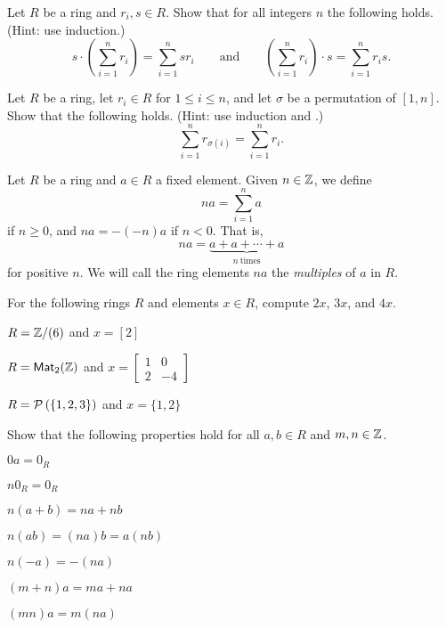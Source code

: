\begin{exercise}
Let \(R\) be a ring and \(r_i, s \in R\). Show that for all integers \(n\) the following holds. (Hint: use induction.) \[ s \cdot \left( \sum_{i=1}^n r_i \right) = \sum_{i=1}^n sr_i \quad\quad \mathrm{and} \quad\quad \left( \sum_{i=1}^n r_i \right) \cdot s = \sum_{i=1}^n r_i s. \]
\end{exercise}

\begin{exercise}
Let \(R\) be a ring, let \(r_i \in R\) for \(1 \leq i \leq n\), and let \(\sigma\) be a permutation of \([1,n]\). Show that the following holds. (Hint: use induction and .) \[ \sum_{i=1}^n r_{\sigma(i)} = \sum_{i=1}^n r_i.  \]
\end{exercise}

\begin{dfn} \label{dfn:mult-elt}
Let \(R\) be a ring and \(a \in R\) a fixed element. Given \(n \in \mathbb{Z}\), we define \[ na = \sum_{i=1}^n a \] if \(n \geq 0\), and \(na = -(-n)a\) if \(n < 0\). That is, \[ na = \underbrace{a + a + \cdots + a}_{n\ \mathrm{times}} \] for positive \(n\). We will call the ring elements \(na\) the \emph{multiples} of \(a\) in \(R\).
\end{dfn}

\begin{exercise}
For the following rings \(R\) and elements \(x \in R\), compute \(2x\), \(3x\), and \(4x\).
\begin{proplist}
\item \(R = \mathbb{Z}/(6)\) and \(x = [2]\)
\item \(R = \mathsf{Mat}_{2}(\mathbb{Z})\) and \(x = \begin{bmatrix} 1 & 0 \\ 2 & -4 \end{bmatrix}\)
\item \(R = \mathcal{P}\left(\{ 1,2,3 \}\right)\) and \(x = \{ 1,2 \}\)
\end{proplist}
\end{exercise}

\begin{exercise}
Show that the following properties hold for all \(a,b \in R\) and \(m,n \in \mathbb{Z}\). \label{exerc:elt-mult}
\begin{proplist*}
\item \(0a = 0_R\)
\item \(n 0_R = 0_R\)
\item \(n(a+b) = na + nb\)
\item \(n(ab) = (na)b = a(nb)\)
\item \(n(-a) = -(na)\)
\item \((m+n)a = ma + na\)
\item \((mn)a = m(na)\)
\end{proplist*}
\end{exercise}

